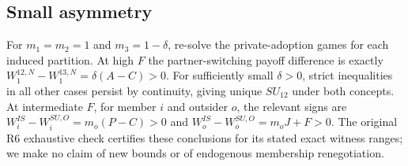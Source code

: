 \subsection{Small asymmetry}
For $m_1=m_2=1$ and $m_3=1-\delta$, re-solve the private-adoption games
for each induced partition. At high $F$ the partner-switching payoff
difference is exactly
$W_1^{12,N}-W_1^{13,N}=\delta(A-C)>0$.
For sufficiently small $\delta>0$, strict inequalities in all other
cases persist by continuity, giving unique $SU_{12}$ under both concepts.
At intermediate $F$, for member $i$ and outsider $o$, the relevant
signs are $W_i^{IS}-W_i^{SU,O}=m_o(P-C)>0$ and
$W_o^{IS}-W_o^{SU,O}=m_oJ+F>0$. The original R6 exhaustive check certifies
these conclusions for its stated exact witness ranges; we make no claim of
new bounds or of endogenous membership renegotiation.
